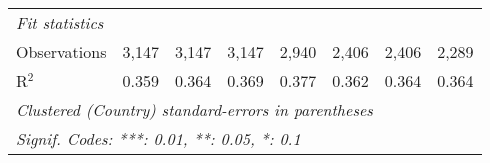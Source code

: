 \begin{tabular}{lccccccc}
   \midrule \emph{Fit statistics}\\
   Observations                                                                  & 3,147        & 3,147        & 3,147         & 2,940        & 2,406          & 2,406          & 2,289\\  
   R$^2$                                                                         & 0.359        & 0.364        & 0.369         & 0.377        & 0.362          & 0.364          & 0.364\\  
   \midrule
   \multicolumn{8}{l}{\emph{Clustered (Country) standard-errors in parentheses}}\\
   \multicolumn{8}{l}{\emph{Signif. Codes: ***: 0.01, **: 0.05, *: 0.1}}\\
\end{tabular}
\par\endgroup


